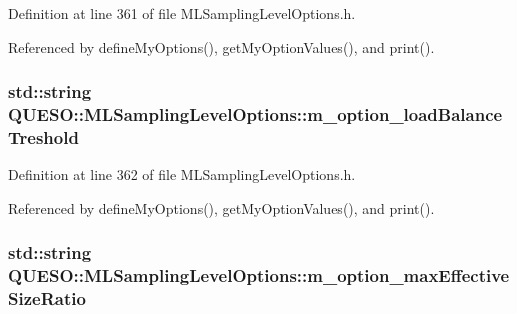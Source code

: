 Definition at line 361 of file M\-L\-Sampling\-Level\-Options.\-h.



Referenced by define\-My\-Options(), get\-My\-Option\-Values(), and print().

\hypertarget{class_q_u_e_s_o_1_1_m_l_sampling_level_options_a818c93c8f5534e93b60246f9a46dbb89}{
\subsubsection[{m\-\_\-option\-\_\-load\-Balance\-Treshold}]{\setlength{\rightskip}{0pt plus 5cm}std\-::string Q\-U\-E\-S\-O\-::\-M\-L\-Sampling\-Level\-Options\-::m\-\_\-option\-\_\-load\-Balance\-Treshold\hspace{0.3cm}{\ttfamily [private]}}}\label{class_q_u_e_s_o_1_1_m_l_sampling_level_options_a818c93c8f5534e93b60246f9a46dbb89}


Definition at line 362 of file M\-L\-Sampling\-Level\-Options.\-h.



Referenced by define\-My\-Options(), get\-My\-Option\-Values(), and print().

\hypertarget{class_q_u_e_s_o_1_1_m_l_sampling_level_options_adbc38162386ba0751cdf09cdeefae07f}{
\subsubsection[{m\-\_\-option\-\_\-max\-Effective\-Size\-Ratio}]{\setlength{\rightskip}{0pt plus 5cm}std\-::string Q\-U\-E\-S\-O\-::\-M\-L\-Sampling\-Level\-Options\-::m\-\_\-option\-\_\-max\-Effective\-Size\-Ratio\hspace{0.3cm}{\ttfamily [private]}}}\label{class_q_u_e_s_o_1_1_m_l_sampling_level_options_adbc38162386ba0751cdf09cdeefae07f}


